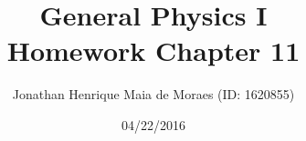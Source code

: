 \title{General Physics I \\ Homework Chapter 11}
\author{Jonathan Henrique Maia de Moraes (ID: 1620855)}
\date{04/22/2016}
\maketitle
